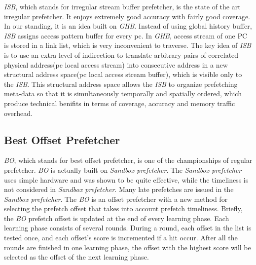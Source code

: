   \emph{ISB}, which stands for irregular stream buffer prefetcher, is the state of the art irregular prefetcher. It enjoys extremely good accuracy with fairly good coverage. In our standing, it is an idea built on \emph{GHB}\cite{ghbpaper}. Instead of using global history buffer, \emph{ISB} assigns access pattern buffer for every pc. In \emph{GHB}, access stream of one PC is stored in a link list, which is very inconvenient to traverse. The key idea of \emph{ISB} is to use an extra level of indirection to translate arbitrary pairs of correlated physical address(pc local access stream) into consecutive address in a new structural address space(pc local access stream buffer), which is visible only to the \emph{ISB}. This structural address space allows the \emph{ISB} to organize prefetching meta-data so that it is simultaneously temporally and spatially ordered, which produce technical benifits in terms of coverage, accuracy and memory traffic overhead.

  \subsection{Best Offset Prefetcher}
  \label{sec:bointro}
  \emph{BO}, which stands for best offset prefetcher, is one of the championships of regular prefetcher. \emph{BO} is actually built on \emph{Sandbox prefetcher}\cite{sandboxpaper}. The \emph{Sandbox prefetcher} uses simple hardware and was shown to be quite effective, while the timeliness is not considered in \emph{Sandbox prefetcher}. Many late prefetches are issued in the \emph{Sandbox prefetcher}. The \emph{BO} is an offset prefetcher with a new method for selecting the prefetch offset that takes into account prefetch timeliness. Briefly, the \emph{BO} prefetch offset is updated at the end of every learning phase. Each learning phase consists of several rounds. During a round, each offset in the list is tested once, and each offset's score is incremented if a hit occur. After all the rounds are finished in one learning phase, the offset with the highest score will be selected as the offset of the next learning phase.
